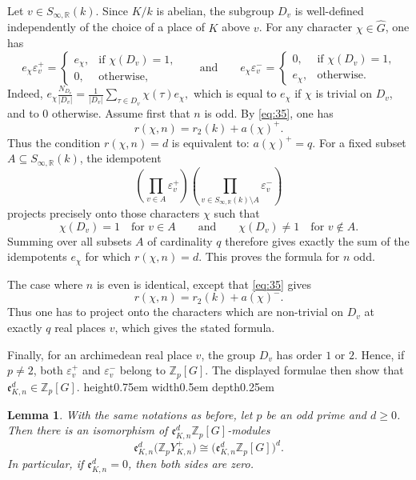 \documentclass[a4paper,11pt]{article}
\newtheorem{lemma}[theorem]{Lemma}
\newenvironment{proof}[1][Proof]{\begin{trivlist}
\item[\hskip \labelsep {\bfseries #1}]}{\end{trivlist}}
\newcommand{\qed}{\nobreak \ifvmode \relax \else
    \ifdim\lastskip<1.5em \hskip-\lastskip
     \hskip1.5em plus0em minus0.5em \fi \nobreak
      \vrule height0.75em width0.5em depth0.25em\fi}
\begin{document}
\begin{proof}
Let \(v\in S_{\infty,\mathbb R}(k)\). Since \(K/k\) is abelian, the subgroup
\(D_v\) is well-defined independently of the choice of a place of \(K\) above
\(v\). For any character \(\chi\in\widehat G\), one has
\[
e_\chi\varepsilon_v^{+}
=
\begin{cases}
e_\chi, & \text{if \(\chi(D_v)=1\),}\\
0, & \text{otherwise,}
\end{cases} \qquad \text{and} \qquad
e_\chi\varepsilon_v^{-}
=
\begin{cases}
0, & \text{if \(\chi(D_v)=1\),}\\
e_\chi, & \text{otherwise.}
\end{cases}
\]
Indeed,
\(
e_\chi\frac{N_{D_v}}{|D_v|}
=
\frac{1}{|D_v|}\sum_{\tau\in D_v}\chi(\tau)e_\chi,
\)
which is equal to \(e_\chi\) if \(\chi\) is trivial on \(D_v\), and to \(0\)
otherwise.
Assume first that \(n\) is odd. By \eqref{eq:35}, one has
\[
r(\chi,n)=r_2(k)+a(\chi)^+.
\]
Thus the condition \(r(\chi,n)=d\) is equivalent to: 
\(
a(\chi)^+=q.
\)
For a fixed subset \(A\subseteq S_{\infty,\mathbb R}(k)\), the idempotent
\[
\left(
\prod_{v\in A}\varepsilon_v^{+}
\right)
\left(
\prod_{v\in S_{\infty,\mathbb R}(k)\setminus A}\varepsilon_v^{-}
\right)
\]
projects precisely onto those characters \(\chi\) such that
\[
\chi(D_v)=1 \quad \text{for \(v\in A\)}
\qquad \text{and}\qquad
\chi(D_v)\neq 1 \quad \text{for \(v\notin A\)}.
\]
Summing over all subsets \(A\) of cardinality \(q\) therefore gives exactly the
sum of the idempotents \(e_\chi\) for which \(r(\chi,n)=d\). This proves the
formula for \(n\) odd.
\vskip 5pt

\noindent The case where \(n\) is even is identical, except that \eqref{eq:35} gives
\[
r(\chi,n)=r_2(k)+a(\chi)^-.
\]
Thus one has to project onto the characters which are non-trivial on \(D_v\) at
exactly \(q\) real places \(v\), which gives the stated formula.

\noindent Finally, for an archimedean real place \(v\), the group \(D_v\) has order
\(1\) or \(2\). Hence, if \(p\neq 2\), both \(\varepsilon_v^{+}\) and
\(\varepsilon_v^{-}\) belong to \(\mathbb Z_p[G]\). The displayed formulae then
show that
\(
\mathfrak e^d_{K,n}\in \mathbb Z_p[G].
\)\qed
\end{proof}
\begin{lemma}
\label{lem:Y-free-over-ed}
With the same notations as before, let \(p\) be an odd prime and \(d\geq 0\). 
Then
there is an isomorphism of \(\mathfrak e_{K,n}^d\mathbb Z_p[G]\)-modules
\[
\mathfrak e_{K,n}^d
\bigl(\mathbb{Z}_pY_{K,n}^{+}\bigr)
\cong
\bigl(\mathfrak e_{K,n}^d\mathbb Z_p[G]\bigr)^d.
\]
In particular, if \(\mathfrak e_{K,n}^d=0\), then both sides are zero.
\end{lemma}
\end{document}
